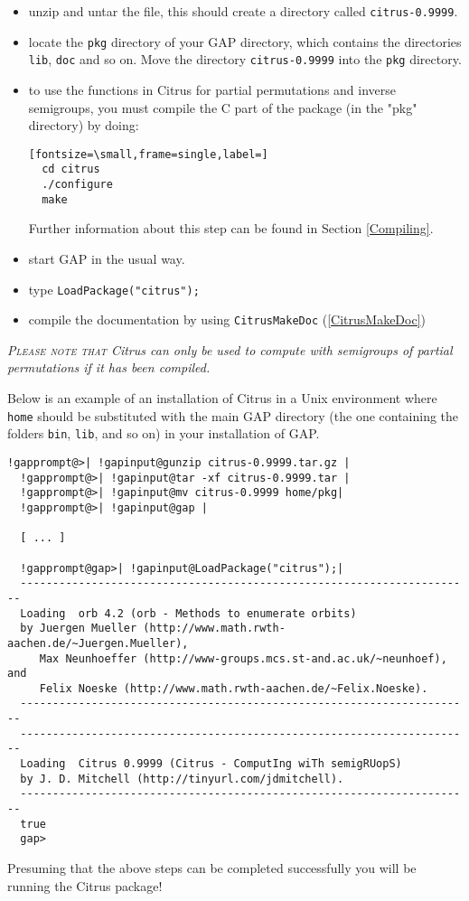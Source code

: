 \documentclass[a4paper,11pt]{report}
\begin{document}
{{\begin{itemize}
\noindent\vspace{\baselineskip} \href{http://www-history.mcs.st-and.ac.uk/~jamesm/citrus/index.html } {\texttt{http://www-history.mcs.st-and.ac.uk/\texttt{}jamesm/citrus/index.html }} 
\item  unzip and untar the file, this should create a directory called \texttt{citrus-0.9999}.
\item  locate the \texttt{pkg} directory of your \textsf{GAP} directory, which contains the directories \texttt{lib}, \texttt{doc} and so on. Move the directory \texttt{citrus-0.9999} into the \texttt{pkg} directory. 
\item  to use the functions in \textsf{Citrus} for partial permutations and inverse semigroups, you must compile the C part
of the package (in the "pkg" directory) by doing: 
\begin{Verbatim}[fontsize=\small,frame=single,label=]
  cd citrus
  ./configure
  make
\end{Verbatim}
 Further information about this step can be found in Section \ref{Compiling}. 
\item  start \textsf{GAP} in the usual way.
\item  type \texttt{LoadPackage("citrus");}
\item  compile the documentation by using \texttt{CitrusMakeDoc} (\ref{CitrusMakeDoc}) 
\end{itemize}
 \emph{\textsc{Please note that} \textsf{Citrus} can only be used to compute with semigroups of partial permutations if it has
been compiled. }

 Below is an example of an installation of \textsf{Citrus} in a Unix environment where \texttt{home} should be substituted with the main \textsf{GAP} directory (the one containing the folders \texttt{bin}, \texttt{lib}, and so on) in your installation of \textsf{GAP}.

 
\begin{Verbatim}[commandchars=!@|,fontsize=\small,frame=single,label=Example]
  !gapprompt@>| !gapinput@gunzip citrus-0.9999.tar.gz |
  !gapprompt@>| !gapinput@tar -xf citrus-0.9999.tar |
  !gapprompt@>| !gapinput@mv citrus-0.9999 home/pkg|
  !gapprompt@>| !gapinput@gap |
  
  [ ... ]
  
  !gapprompt@gap>| !gapinput@LoadPackage("citrus");|
  ----------------------------------------------------------------------
  Loading  orb 4.2 (orb - Methods to enumerate orbits)
  by Juergen Mueller (http://www.math.rwth-aachen.de/~Juergen.Mueller),
     Max Neunhoeffer (http://www-groups.mcs.st-and.ac.uk/~neunhoef), and
     Felix Noeske (http://www.math.rwth-aachen.de/~Felix.Noeske).
  ----------------------------------------------------------------------
  ----------------------------------------------------------------------
  Loading  Citrus 0.9999 (Citrus - ComputIng wiTh semigRUopS)
  by J. D. Mitchell (http://tinyurl.com/jdmitchell).
  ----------------------------------------------------------------------
  true
  gap>
\end{Verbatim}
 Presuming that the above steps can be completed successfully you will be
running the \textsf{Citrus} package!

}}
\end{document}
